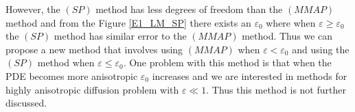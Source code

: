 \documentclass[12pt]{ociamthesis}
\begin{document}
However, the $(SP)$ method has less degrees of freedom than the $(MMAP)$ method and from the Figure \ref{E1_LM_SP} there exists an $\varepsilon_0$ where when $\varepsilon \geq \varepsilon_0$ the $(SP)$ method has similar error to the $(MMAP)$ method. Thus we can propose a new method that involves using $(MMAP)$ when $\varepsilon < \varepsilon_0$ and using the $(SP)$ method when $\varepsilon \leq \varepsilon_0$. One problem with this method is that when the PDE becomes more anisotropic $\varepsilon_0$ increases and we are interested in methods for highly anisotropic diffusion problem with $\varepsilon \ll 1$. Thus this method is not further discussed.

\begin{table}[H]
\end{table}
\end{document}
